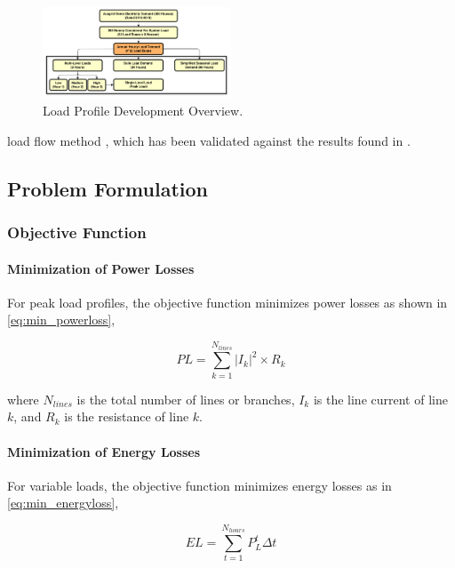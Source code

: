 \documentclass[conference]{IEEEtran}
\begin{document}
\begin{figure}[htbp]
	\centerline{\includegraphics[width=0.5\textwidth]{loadprofileoverview.png}}
	\caption{Load Profile Development Overview.}
	\vspace{-10pt}
	\label{fig:loadprofileoverview}
\end{figure}

\noindent load flow method \cite{BFS}, which has been validated against the results found in \cite{Bouchekara}. 



\subsection{Problem Formulation}
\subsubsection{Objective Function}

\paragraph{Minimization of Power Losses}
For peak load profiles, the objective function minimizes power losses as shown in \eqref{eq:min_powerloss},

\begin{equation}
	PL=\sum_{k=1}^{N_{lines}} \left|I_{k}\right|^{2} \times R_{k}
	\label{eq:min_powerloss}
\end{equation}

where $N_{lines}$ is the total number of lines or branches, $I_k$ is the line current of line $k$, and $R_k$ is the resistance of line $k$.

\paragraph{Minimization of Energy Losses}
For variable loads, the objective function minimizes energy losses as in \eqref{eq:min_energyloss},

\begin{equation}
	EL= \sum_{t=1}^{N_{hours}}  P_{L}^t \Delta t
	\label{eq:min_energyloss}
\end{equation}
\end{document}
